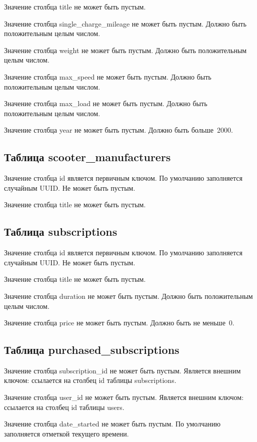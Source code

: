 Значение столбца title не может быть пустым.

Значение столбца single\_charge\_mileage не может быть пустым. Должно быть положительным целым числом.

Значение столбца weight не может быть пустым. Должно быть положительным целым числом.

Значение столбца max\_speed не может быть пустым. Должно быть положительным целым числом.

Значение столбца max\_load не может быть пустым. Должно быть положительным целым числом.

Значение столбца year не может быть пустым. Должно быть больше~2000.

\subsection{Таблица scooter\_manufacturers}

Значение столбца id является первичным ключом. По умолчанию заполняется случайным UUID. Не может быть пустым.

Значение столбца title не может быть пустым.

\subsection{Таблица subscriptions}

Значение столбца id является первичным ключом. По умолчанию заполняется случайным UUID. Не может быть пустым.

Значение столбца title не может быть пустым.

Значение столбца duration не может быть пустым. Должно быть положительным целым числом.

Значение столбца price не может быть пустым. Должно быть не меньше~0.

\subsection{Таблица purchased\_subscriptions}

Значение столбца subscription\_id не может быть пустым. Является внешним ключом: ссылается на столбец id таблицы subscriptions.

Значение столбца user\_id не может быть пустым. Является внешним ключом: ссылается на столбец id таблицы users.

Значение столбца date\_started не может быть пустым. По умолчанию заполняется отметкой текущего времени.

